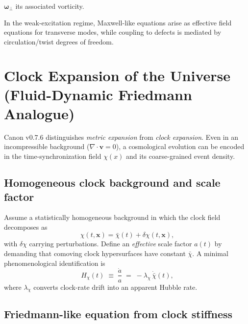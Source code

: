 \documentclass[10pt]{article}
\newcommand{\divop}{\nabla\cdot}
\begin{document}
    $\boldsymbol{\omega}_\perp$ its associated vorticity.

    In the weak-excitation regime, Maxwell-like equations arise as effective field
    equations for transverse modes, while coupling to defects is mediated by
    circulation/twist degrees of freedom.

    
    \section{Clock Expansion of the Universe (Fluid-Dynamic Friedmann Analogue)}
    \label{sec:cosmo_clock_expansion}

Canon v0.7.6 distinguishes \emph{metric expansion} from \emph{clock expansion}.
Even in an incompressible background ($\divop \mathbf{v}=0$), a cosmological
evolution can be encoded in the time-synchronization field $\chi(x)$ and its
coarse-grained event density.

\subsection{Homogeneous clock background and scale factor}

Assume a statistically homogeneous background in which the clock field decomposes as
\begin{equation}
    \chi(t,\mathbf{x}) = \bar{\chi}(t) + \delta\chi(t,\mathbf{x}),
\end{equation}
with $\delta\chi$ carrying perturbations. Define an \emph{effective} scale factor
$a(t)$ by demanding that comoving clock hypersurfaces have constant $\bar{\chi}$.
A minimal phenomenological identification is
\begin{equation}
    H_\chi(t) \;\equiv\; \frac{\dot{a}}{a} \;=\; -\lambda_\chi\,\dot{\bar{\chi}}(t),
    \label{eq:Hchi_def}
\end{equation}
where $\lambda_\chi$ converts clock-rate drift into an apparent Hubble rate.

\subsection{Friedmann-like equation from clock stiffness}
\end{document}
